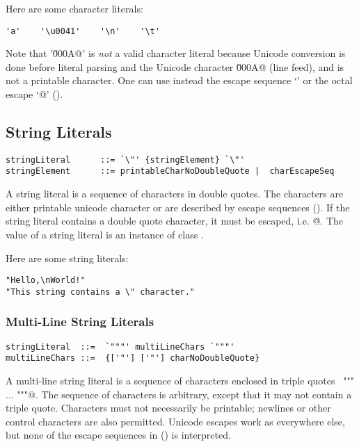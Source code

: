 \example
Here are some character literals:
\begin{lstlisting}
'a'    '\u0041'    '\n'    '\t'
\end{lstlisting}
Note that '\lstinline@\u000A@' is {\em not} a valid character literal because
Unicode conversion is done before literal parsing and the Unicode
character \lstinline@\u000A@ (line feed), and is not a printable
character. One can use instead the escape sequence `\lstinline@\n@' or
the octal escape `\lstinline@{}@' ().

\subsection{String Literals}\label{sec:string-literals}

\syntax\begin{lstlisting}
stringLiteral      ::= `\"' {stringElement} `\"'
stringElement      ::= printableCharNoDoubleQuote |  charEscapeSeq
\end{lstlisting}

A string literal is a sequence of characters in double quotes.  The
characters are either printable unicode character or are described by
escape sequences (). If the string literal
contains a double quote character, it must be escaped,
i.e. \lstinline@\"@. The value of a string literal is an instance of
class \lstinline@String@. 

\example
Here are some string literals:
\begin{lstlisting}
"Hello,\nWorld!"       
"This string contains a \" character."
\end{lstlisting}

\subsubsection*{Multi-Line String Literals}

\syntax\begin{lstlisting}
stringLiteral  ::=  `"""' multiLineChars `"""'
multiLineChars ::=  {['"'] ['"'] charNoDoubleQuote}
\end{lstlisting}

A multi-line string literal is a sequence of characters enclosed in
triple quotes ~\lstinline@""" ... """@. The sequence of characters is
arbitrary, except that it may not contain a triple quote. Characters
must not necessarily be printable; newlines or other
control characters are also permitted.  Unicode escapes work as everywhere else, but none
of the escape sequences in () is interpreted.

